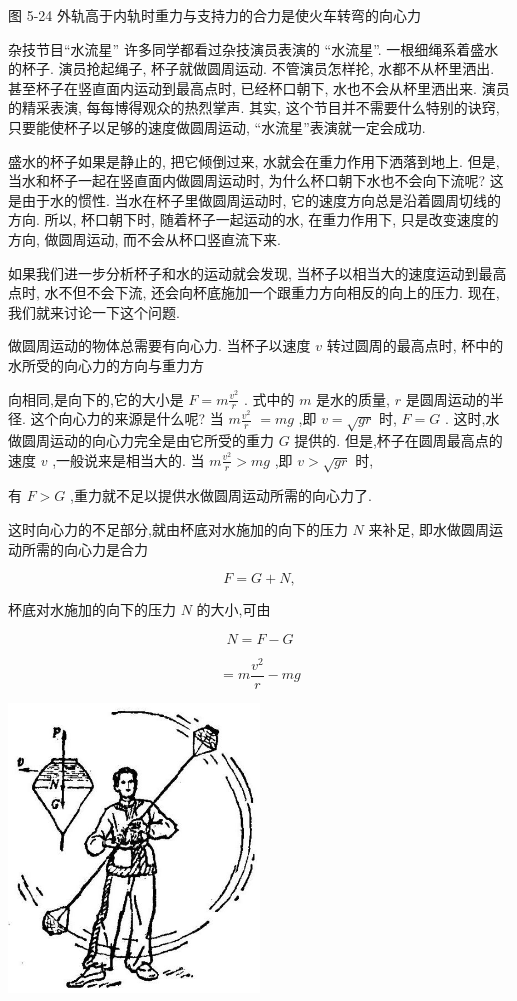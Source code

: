 \documentclass[10pt]{article}
\begin{document}
图 5-24 外轨高于内轨时重力与支持力的合力是使火车转弯的向心力

杂技节目“水流星” 许多同学都看过杂技演员表演的 “水流星”. 一根细绳系着盛水的杯子. 演员抢起绳子, 杯子就做圆周运动. 不管演员怎样抡, 水都不从杯里洒出. 甚至杯子在竖直面内运动到最高点时, 已经杯口朝下, 水也不会从杯里洒出来. 演员的精采表演, 每每博得观众的热烈掌声. 其实, 这个节目并不需要什么特别的诀窍, 只要能使杯子以足够的速度做圆周运动, “水流星”表演就一定会成功.

盛水的杯子如果是静止的, 把它倾倒过来, 水就会在重力作用下洒落到地上. 但是, 当水和杯子一起在竖直面内做圆周运动时, 为什么杯口朝下水也不会向下流呢? 这是由于水的惯性. 当水在杯子里做圆周运动时, 它的速度方向总是沿着圆周切线的方向. 所以, 杯口朝下时, 随着杯子一起运动的水, 在重力作用下, 只是改变速度的方向, 做圆周运动, 而不会从杯口竖直流下来.

如果我们进一步分析杯子和水的运动就会发现, 当杯子以相当大的速度运动到最高点时, 水不但不会下流, 还会向杯底施加一个跟重力方向相反的向上的压力. 现在, 我们就来讨论一下这个问题.

做圆周运动的物体总需要有向心力. 当杯子以速度 \(v\) 转过圆周的最高点时, 杯中的水所受的向心力的方向与重力方

向相同,是向下的,它的大小是 \(F = m\frac{{v}^{2}}{r}\) . 式中的 \(m\) 是水的质量, \(r\) 是圆周运动的半径. 这个向心力的来源是什么呢? 当 \(m\frac{{v}^{2}}{r}\) \(= {mg}\) ,即 \(v = \sqrt{gr}\) 时, \(F = G\) . 这时,水做圆周运动的向心力完全是由它所受的重力 \(G\) 提供的. 但是,杯子在圆周最高点的速度 \(v\) ,一般说来是相当大的. 当 \(m\frac{{v}^{2}}{r} > {mg}\) ,即 \(v > \sqrt{gr}\) 时,

有 \(F > G\) ,重力就不足以提供水做圆周运动所需的向心力了.

这时向心力的不足部分,就由杯底对水施加的向下的压力 \(N\) 来补足, 即水做圆周运动所需的向心力是合力

\[
F = G + N,
\]

杯底对水施加的向下的压力 \(N\) 的大小,可由

\[
N = F - G
\]

\[
= m\frac{{v}^{2}}{r} - {mg}
\]

\begin{center}
\includegraphics[max width=0.5\textwidth]{images/01912d55-147c-70aa-b0e0-1782a122f948_150_255302.jpg}
\end{center}
\end{document}
